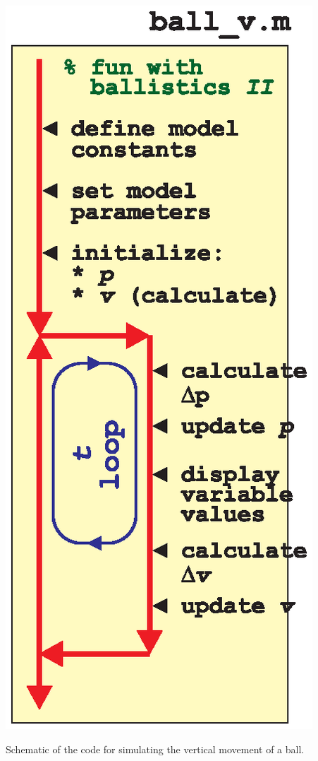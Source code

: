 \documentclass{tufte-book} %
\begin{document}
\begin{marginfigure}[-0.0in]
\includegraphics[width=\linewidth]{ch9-schematic-ball_v.eps}
\caption{Schematic of the code for simulating the vertical movement of a ball.}
\label{fig:ch9-schematic-ball_v}
\end{marginfigure}
\end{document}
